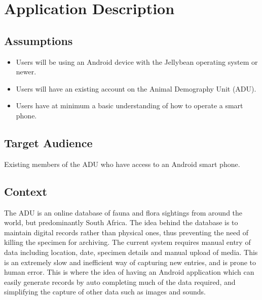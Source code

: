 \documentclass[
10pt, %
a4paper, %
oneside, %
headinclude,footinclude, %
BCOR5mm, %
]{scrartcl}
\begin{document}
\section{Application Description} %
\label{sec:application_description}

\subsection{Assumptions}
\label{sub:assumptions}

\begin{itemize}
\item Users will be using an Android device with the Jellybean operating system or newer.
\item Users will have an existing account on the Animal Demography Unit (ADU).
\item Users have at minimum a basic understanding of how to operate a smart phone.
\end{itemize}


\subsection{Target Audience}
\label{sub:target_audience}

Existing members of the ADU who have access to an Android smart phone.


\subsection{Context}
\label{sub:context}

The ADU is an online database of fauna and flora sightings from around the world, but predominantly South Africa. The idea behind the database is to maintain digital records rather than physical ones, thus preventing the need of killing the specimen for archiving. The current system requires manual entry of data including location, date, specimen details and manual upload of media. This is an extremely slow and inefficient way of capturing new entries, and is prone to human error. This is where the idea of having an Android application which can easily generate records by auto completing much of the data required, and simplifying the capture of other data such as images and sounds. 

\end{document}
